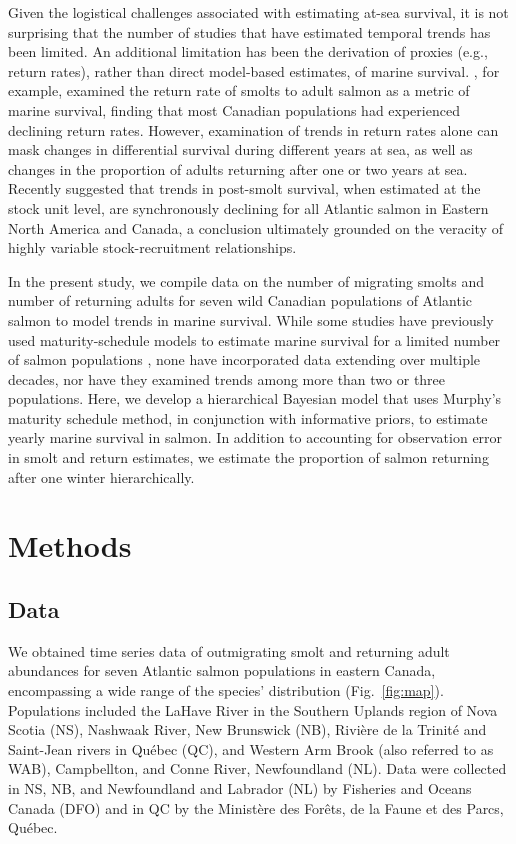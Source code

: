 \documentclass[12pt]{article}
\begin{document}
Given the logistical challenges associated with estimating at-sea survival, it
is not surprising that the number of studies that have estimated temporal
trends has been limited. An additional limitation has been the derivation of
proxies (e.g., return rates), rather than direct model-based estimates, of
marine survival.
\citet{Chaput2012a}, for example, examined the return rate of smolts to adult salmon 
as a metric of marine survival, finding that most Canadian populations 
had experienced declining return rates. 
However, examination of trends in return rates alone
can mask changes in differential survival during different years at sea, as well
as changes in the proportion of adults returning after one or two years at sea.
Recently \citet{Olmos2019} suggested that trends in post-smolt
survival, when estimated at the stock unit level, are synchronously declining
for all Atlantic salmon in Eastern North America and Canada, a conclusion ultimately 
grounded on the veracity of highly variable stock-recruitment relationships.

In the present study, we compile data on the number of migrating smolts and number of returning adults 
for seven wild Canadian populations of Atlantic salmon to model trends in marine survival.
While some studies have previously used maturity-schedule models to estimate marine
survival for a limited number of salmon populations \citep{Chaput2003b}, none
have incorporated data extending over multiple decades, nor have they examined
trends among more than two or three populations. 
Here, we develop a hierarchical Bayesian model that uses Murphy's maturity
schedule method, in conjunction with informative priors, to estimate yearly
marine survival in salmon. In addition to accounting for observation error in
smolt and return estimates, we estimate the proportion of salmon returning
after one winter hierarchically.

\section*{Methods}

\subsection*{Data}

We obtained time series data of outmigrating smolt and returning adult
abundances for seven Atlantic salmon populations in eastern Canada, encompassing a
wide range of the species' distribution (Fig.~\ref{fig:map}). 
Populations included the LaHave River in the Southern Uplands region of Nova
Scotia (NS), Nashwaak River, New Brunswick (NB), Rivi\`{e}re de la Trinit\'{e} and
Saint-Jean rivers in Qu\'{e}bec (QC), and  Western Arm Brook (also referred to as  WAB), Campbellton, and
Conne River, Newfoundland (NL). 
Data were collected in NS, NB, and Newfoundland
and Labrador (NL) by Fisheries and Oceans Canada (DFO) and in QC
by the Minist\`{e}re des For\^{e}ts, de la Faune et des Parcs, Qu\'{e}bec.
\end{document}
